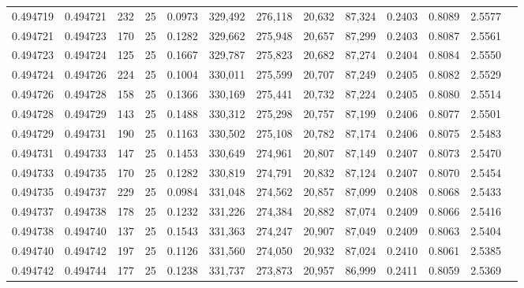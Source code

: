 \begin{tabular}{rrrrrrrrrrrrr}
0.494719 & 0.494721 &   232 &  25 &                                     0.0973 & 329,492 & 276,118 &  20,632 &  87,324 & 0.2403 & 0.8089 & 2.5577 \\
0.494721 & 0.494723 &   170 &  25 &                                     0.1282 & 329,662 & 275,948 &  20,657 &  87,299 & 0.2403 & 0.8087 & 2.5561 \\
0.494723 & 0.494724 &   125 &  25 &                                     0.1667 & 329,787 & 275,823 &  20,682 &  87,274 & 0.2404 & 0.8084 & 2.5550 \\
0.494724 & 0.494726 &   224 &  25 &                                     0.1004 & 330,011 & 275,599 &  20,707 &  87,249 & 0.2405 & 0.8082 & 2.5529 \\
0.494726 & 0.494728 &   158 &  25 &                                     0.1366 & 330,169 & 275,441 &  20,732 &  87,224 & 0.2405 & 0.8080 & 2.5514 \\
0.494728 & 0.494729 &   143 &  25 &                                     0.1488 & 330,312 & 275,298 &  20,757 &  87,199 & 0.2406 & 0.8077 & 2.5501 \\
0.494729 & 0.494731 &   190 &  25 &                                     0.1163 & 330,502 & 275,108 &  20,782 &  87,174 & 0.2406 & 0.8075 & 2.5483 \\
0.494731 & 0.494733 &   147 &  25 &                                     0.1453 & 330,649 & 274,961 &  20,807 &  87,149 & 0.2407 & 0.8073 & 2.5470 \\
0.494733 & 0.494735 &   170 &  25 &                                     0.1282 & 330,819 & 274,791 &  20,832 &  87,124 & 0.2407 & 0.8070 & 2.5454 \\
0.494735 & 0.494737 &   229 &  25 &                                     0.0984 & 331,048 & 274,562 &  20,857 &  87,099 & 0.2408 & 0.8068 & 2.5433 \\
0.494737 & 0.494738 &   178 &  25 &                                     0.1232 & 331,226 & 274,384 &  20,882 &  87,074 & 0.2409 & 0.8066 & 2.5416 \\
0.494738 & 0.494740 &   137 &  25 &                                     0.1543 & 331,363 & 274,247 &  20,907 &  87,049 & 0.2409 & 0.8063 & 2.5404 \\
0.494740 & 0.494742 &   197 &  25 &                                     0.1126 & 331,560 & 274,050 &  20,932 &  87,024 & 0.2410 & 0.8061 & 2.5385 \\
0.494742 & 0.494744 &   177 &  25 &                                     0.1238 & 331,737 & 273,873 &  20,957 &  86,999 & 0.2411 & 0.8059 & 2.5369 \\

\end{tabular}
